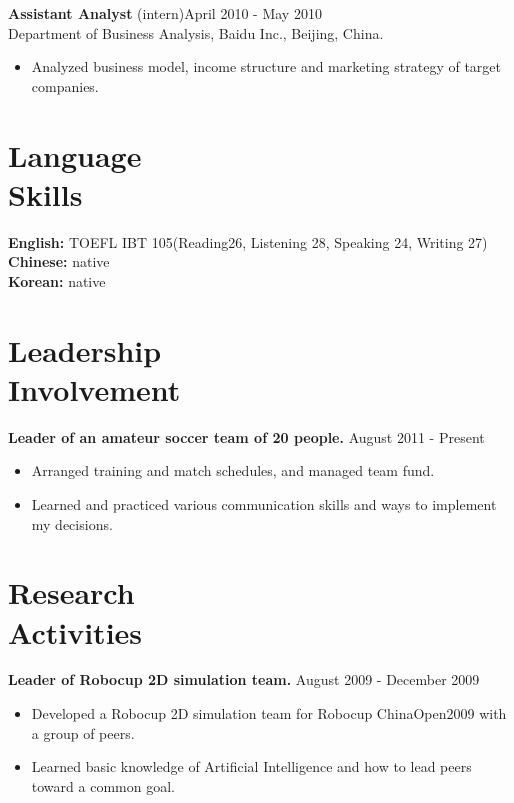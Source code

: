 \documentclass[margin]{res}
\begin{document}
\begin{resume}
                {\bf Assistant Analyst} (intern)\hfill            April 2010 - May 2010 \\
                Department of Business Analysis, Baidu Inc., Beijing, China. 
                 \begin{itemize}  \itemsep -2pt %
                 \item Analyzed business model, income structure and marketing strategy of target companies.
                 \end{itemize} 

 \section{Language \\ Skills} 
				{\bf English:} TOEFL IBT 105(Reading26, Listening 28, Speaking 24, Writing 27)\\
				{\bf Chinese:} native \\
				{\bf Korean: } native	\\	 
 
 \section{Leadership \\ Involvement} 
				{ \bf Leader of an amateur soccer team of 20 people.} \hfill August 2011 - Present \\           
                 \begin{itemize}  \itemsep -2pt %
                 \item Arranged training and match schedules, and managed team fund. 
                \item  Learned and practiced various communication skills and ways to implement my decisions.
                \end{itemize}

\section{Research \\ Activities} 
				{ \bf Leader of Robocup 2D simulation team.} \hfill August 2009 - December 2009 \\  								
                 \begin{itemize}  \itemsep -2pt %
                 \item Developed a Robocup 2D simulation team for Robocup ChinaOpen2009 with a group of peers. 
                \item  Learned basic knowledge of Artificial Intelligence and how to lead peers toward a common goal.
                \end{itemize}


\end{resume}
\end{document}
